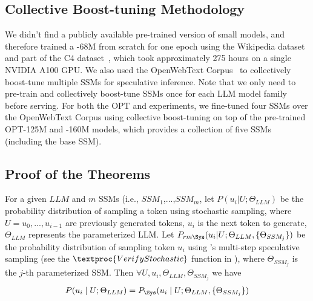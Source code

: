 \subsection{Collective Boost-tuning Methodology}
\label{sec:cbt_method}
We didn't find a publicly available pre-trained version of small \llama models, and therefore trained a \llama-68M from scratch for one epoch using the Wikipedia dataset~\cite{wikidump} and part of the C4 dataset~\cite{2019t5}, which took approximately 275 hours on a single NVIDIA A100 GPU.
We also used the OpenWebText Corpus~\cite{Gokaslan2019OpenWeb} to collectively boost-tune multiple SSMs for speculative inference.
Note that we only need to pre-train and collectively boost-tune SSMs once for each LLM model family before serving. 
For both the OPT and \llama experiments, we fine-tuned four SSMs over the OpenWebText Corpus using collective boost-tuning on top of the pre-trained OPT-125M and \llama-160M models, which provides a collection of five SSMs (including the base SSM).



\subsection{Proof of the Theorems}
\label{sec:appendix}
\begin{theorem}
For a given $LLM$ and $m$ SSMs (i.e., $SSM_1$,...,$SSM_m$, let $P(u_i | U; \Theta_{LLM})$ be the probability distribution of sampling a token using stochastic sampling, where $U = u_0,...,u_{i-1}$ are previously generated tokens, $u_i$ is the next token to generate, $\Theta_{LLM}$ represents the parameterized LLM. Let $P_{rm{\Sys}}(u_i | U; \Theta_{LLM}, \{\Theta_{SSM_j}\})$ be the probability distribution of sampling token $u_i$ using \Sys's multi-step speculative sampling (see the $\textproc{VerifyStochastic}$ function in ), where $\Theta_{SSM_j}$ is the $j$-th parameterized SSM. Then $ \forall U, u_i, \Theta_{LLM}, \Theta_{SSM_j}$ we have
\begin{eqnarray}
P(u_i \mid U; \Theta_{LLM}) = P_{\rm{\Sys}}(u_i \mid U; \Theta_{LLM}, \{\Theta_{SSM_j}\})
\end{eqnarray}
\end{theorem}

